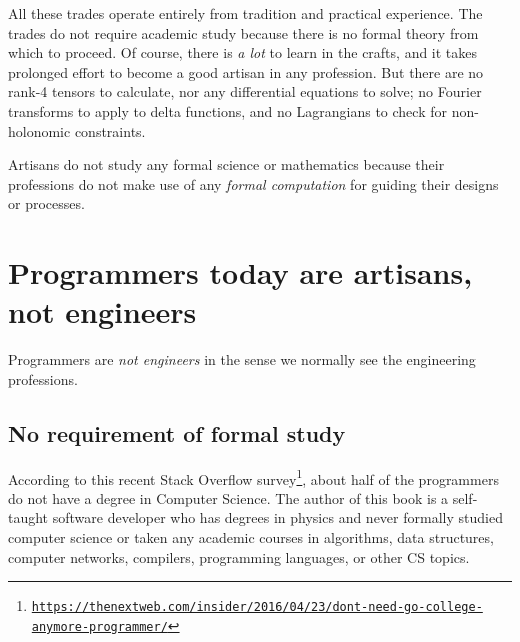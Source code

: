 All these trades operate entirely from tradition and practical experience.
The trades do not require academic study because there is no formal
theory from which to proceed. Of course, there is \emph{a lot} to
learn in the crafts, and it takes prolonged effort to become a good
artisan in any profession. But there are no rank-4 tensors to calculate,
nor any differential equations to solve; no Fourier transforms to
apply to delta functions, and no Lagrangians to check for non-holonomic
constraints.

Artisans do not study any formal science or mathematics because their
professions do not make use of any \emph{formal computation} for guiding
their designs or processes.

\section{Programmers today are artisans, not engineers }

Programmers are \emph{not engineers} in the sense we normally see
the engineering professions.

\subsection{No requirement of formal study }

According to this recent Stack Overflow survey\footnote{\texttt{\href{https://thenextweb.com/insider/2016/04/23/dont-need-go-college-anymore-programmer/}{https://thenextweb.com/insider/2016/04/23/dont-need-go-college-anymore-programmer/}}},
about half of the programmers do not have a degree in Computer Science.
The author of this book is a self-taught software developer who has
degrees in physics and never formally studied computer science or
taken any academic courses in algorithms, data structures, computer
networks, compilers, programming languages, or other CS topics. 

